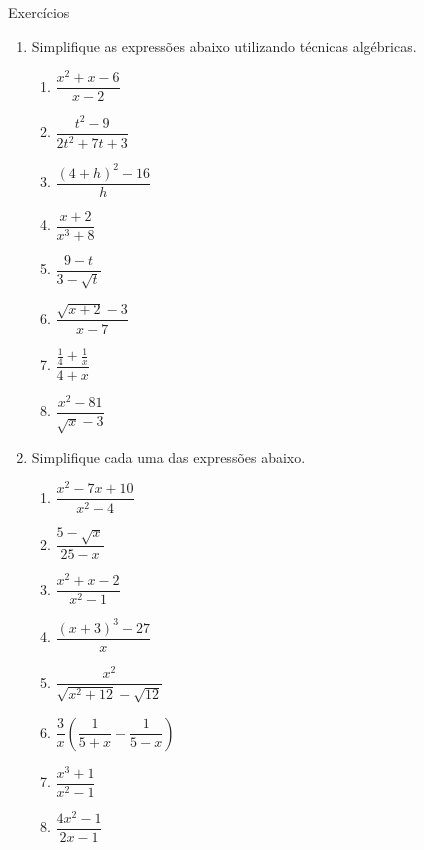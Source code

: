\documentclass[14pt, aspectratio=169]{beamer}
\newcommand{\parenthesis}[1]{\left( #1 \right)}
\begin{document}
\begin{frame}[allowframebreaks]{Exercícios}
    \begin{enumerate}
        \item Simplifique as expressões abaixo utilizando técnicas algébricas.
        
        \begin{multicols}{2}
            \begin{enumerate}[a]
                \item $\dfrac{x^2 + x - 6}{x - 2}$
                \item $\dfrac{t^2 - 9}{2t^2 + 7t + 3}$
                \item $\dfrac{\parenthesis{4+h}^2 - 16}{h}$
                \item $\dfrac{x+2}{x^3 + 8}$
                \item $\dfrac{9 - t}{3 - \sqrt{t}}$
                \item $\dfrac{\sqrt{x+2}-3}{x-7}$   
                \item $\dfrac{\frac{1}{4}+\frac{1}{x}}{4+x}$
                \item $\dfrac{x^2-81}{\sqrt{x}-3}$
            \end{enumerate}
        \end{multicols}

        \item Simplifique cada uma das expressões abaixo.
        
        \begin{multicols}{2}
            \begin{enumerate}[a]
                \item $\dfrac{x^2 - 7x + 10}{x^2 - 4}$
                \item $\dfrac{5-\sqrt{x}}{25-x}$
                \item $\dfrac{x^2 + x - 2}{x^2 - 1}$
                \item $\dfrac{(x+3)^3 - 27}{x}$
                \item $\dfrac{x^2}{\sqrt{x^2 + 12}-\sqrt{12}}$
                \item $\dfrac{3}{x} \parenthesis{\dfrac{1}{5+x} - \dfrac{1}{5-x}}$
                \item $\dfrac{x^3 + 1}{x^2 - 1}$
                \item $\dfrac{4x^2 - 1}{2x - 1}$
            \end{enumerate}
        \end{multicols}
        
        
        
    \end{enumerate}
\end{frame}
\end{document}

